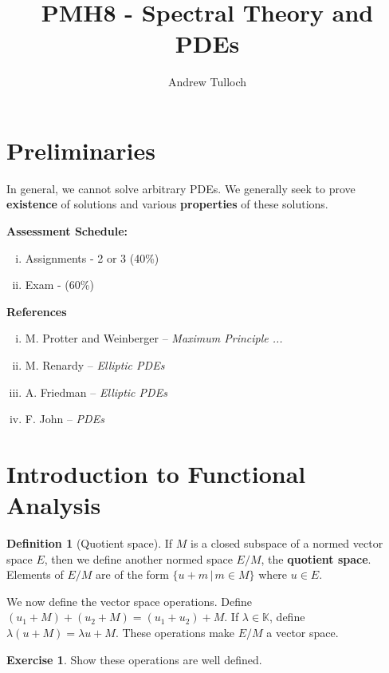 \documentclass[10pt, oneside, reqno]{amsart}
\title{PMH8 - Spectral Theory and PDEs}								%
\author{Andrew Tulloch}
\theoremstyle{plain}%
\numberwithin{equation}{section}
\theoremstyle{definition}
\newtheorem{defn}[thm]{Definition}
\newtheorem{exer}[thm]{Exercise}
\theoremstyle{remark}
\newcommand{\given}{ \, | \,}
\newcommand{\K}{\mathbb{K}}
\begin{document}
\maketitle

\section{Preliminaries} %
\label{sec:preliminaries}


In general, we cannot solve arbitrary PDEs.  We generally seek to prove \textbf{existence} of solutions and various \textbf{properties} of these solutions.  


\textbf{Assessment Schedule:}
\begin{enumerate}[(i)]
	\item Assignments - 2 or 3 (40\%)
	\item Exam - (60\%) 
\end{enumerate}

\textbf{References}
\begin{enumerate}[(i)]
	\item M. Protter and Weinberger -- \emph{Maximum Principle ...}
	\item M. Renardy -- \emph{Elliptic PDEs}
	\item A. Friedman -- \emph{Elliptic PDEs}
	\item F. John -- \emph{PDEs}
\end{enumerate}

\section{Introduction to Functional Analysis} %
\label{sec:introduction_to_functional_analysis_}

\begin{defn}[Quotient space]
	If $M$ is a closed subspace of a normed vector space $E$, then we define another normed space $E / M$, the \textbf{quotient space}.  Elements of $E / M$ are of the form  $\{ u + m \given m \in M \}$ where $u \in E$. 

	We now define the vector space operations.  Define $(u_1 + M) + (u_2 + M) = (u_1 + u_2) + M$.  If $\lambda \in \K$, define $\lambda(u + M) = \lambda u + M$.  These operations make $E/M$ a vector space.
\end{defn}

\begin{exer}
	Show these operations are well defined.  
\end{exer}  
\end{document}
